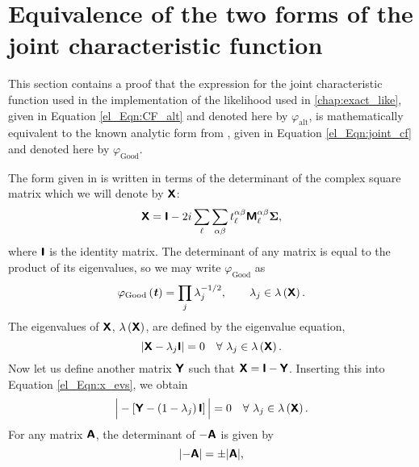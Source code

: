 \section{Equivalence of the two forms of the joint characteristic function}
\label{el_App:cf_equivalance}

This section contains a proof that the expression for the joint characteristic function used in
the implementation of the likelihood used in \autoref{chap:exact_like},
given in Equation \eqref{el_Eqn:CF_alt} and denoted here by $\varphi_\mathrm{alt}$, is mathematically equivalent to the known analytic form from \citet{Good1963}, given in Equation \eqref{el_Eqn:joint_cf} and denoted here by $\varphi_\mathrm{Good}$.

The form given in \citet{Good1963} is written in terms of the determinant of the complex square matrix which we will denote by $\bm{\mathsf{X}}$:
\begin{equation}
\bm{\mathsf{X}} =
\bm{\mathsf{I}} - 2i \sum_\ell \sum_{\alpha \beta}
t_\ell^{\alpha \beta} \bm{\mathsf{M}}_\ell^{\alpha \beta} \bm{\Sigma},
\end{equation}
where $\bm{\mathsf{I}}$ is the identity matrix. The determinant of any matrix is equal to the product of its eigenvalues, so we may write $\varphi_\mathrm{Good}$ as
\begin{equation}
\varphi_\mathrm{Good} \left( \bm{\mathit{t}} \right) =
\prod_j \lambda_j^{-1/2}, \quad \quad
\lambda_j \in \lambda \left( \bm{\mathsf{X}} \right).
\end{equation}
The eigenvalues of $\bm{\mathsf{X}}$, $\lambda \left( \bm{\mathsf{X}} \right)$, are defined by the eigenvalue equation,
\begin{equation}
    \lvert \bm{\mathsf{X}} - \lambda_j \bm{\mathsf{I}} \rvert = 0 \quad
    \forall ~ \lambda_j \in \lambda \left( \bm{\mathsf{X}} \right).
    \label{el_Eqn:x_evs}
\end{equation}
Now let us define another matrix $\bm{\mathsf{Y}}$ such that $\bm{\mathsf{X}} = \bm{\mathsf{I}} - \bm{\mathsf{Y}}$. Inserting this into Equation \eqref{el_Eqn:x_evs}, we obtain
\begin{equation}
    \Big\lvert
    - \left[ \bm{\mathsf{Y}} - \left( 1 - \lambda_j \right) \bm{\mathsf{I}}\right]
    \Big\rvert = 0 \quad
    \forall ~ \lambda_j \in \lambda \left( \bm{\mathsf{X}} \right).
    \label{el_Eqn:det_y}
\end{equation}
For any matrix $\bm{\mathsf{A}}$, the determinant of $- \bm{\mathsf{A}}$ is given by
\begin{equation}
    \lvert - \bm{\mathsf{A}} \rvert = \pm \lvert \bm{\mathsf{A}} \rvert,
\end{equation}

